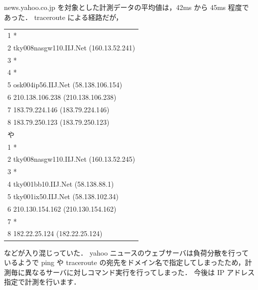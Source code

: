 \documentclass[a4j]{jarticle}
\begin{document}
news.yahoo.co.jp を対象とした計測データの平均値は，42ms から 45ms 程度であった．
traceroute による経路だが，
\begin{table}[H]
\centering
\begin{tabular}{l}
 1  *\\
 2  tky008nasgw110.IIJ.Net (160.13.52.241)\\
 3  *\\
 4  *\\
 5  osk004ip56.IIJ.Net (58.138.106.154)\\
 6  210.138.106.238 (210.138.106.238)\\
 7  183.79.224.146 (183.79.224.146)\\
 8  183.79.250.123 (183.79.250.123)\\
や\\
 1  *\\
 2  tky008nasgw110.IIJ.Net (160.13.52.245)\\
 3  *\\
 4  tky001bb10.IIJ.Net (58.138.88.1)\\
 5  tky001ix50.IIJ.Net (58.138.102.34)\\
 6  210.130.154.162 (210.130.154.162)\\
 7  *\\
 8  182.22.25.124 (182.22.25.124)\\
\end{tabular}
\end{table}
などが入り混じっていた．
yahoo ニュースのウェブサーバは負荷分散を行っているようで ping や traceroute の宛先をドメイン名で指定してしまったため，計測毎に異なるサーバに対しコマンド実行を行ってしまった．
今後は IP アドレス指定で計測を行います．
 
\end{document}
